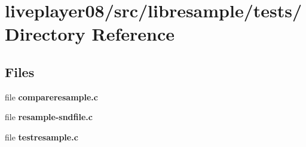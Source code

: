 \section{liveplayer08/src/libresample/tests/ Directory Reference}
\label{dir_d023f6795e14d3e34625fe122c7c6ec0}
\subsection*{Files}
\begin{CompactItemize}
\item 
file {\bf compareresample.c}
\item 
file {\bf resample-sndfile.c}
\item 
file {\bf testresample.c}
\end{CompactItemize}
